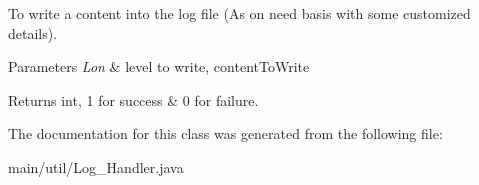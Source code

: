 To write a content into the log file (As on need basis with some customized details). 
\begin{DoxyParams}{Parameters}
{\em Lon} & level to write, content\+To\+Write \\
\hline
\end{DoxyParams}
\begin{DoxyReturn}{Returns}
int, 1 for success \& 0 for failure. 
\end{DoxyReturn}


The documentation for this class was generated from the following file\+:\begin{DoxyCompactItemize}
\item 
main/util/Log\+\_\+\+Handler.\+java\end{DoxyCompactItemize}
